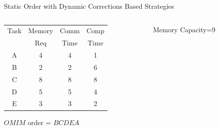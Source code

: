 \documentclass[mathserif,hyperref={pdfpagemode=FullScreen}]{beamer}
\newcommand{\schedule}[3]{
	\draw[->] (-0.2, 0) -- (#1, 0) node[below] {$t$};
	\draw (0, 0) -- (0, 1.5);
	\node at (-0.8, 0.75)[rotate=90] {#2};
	\draw[dashed,gray] (0, 0.75) -- (#1, 0.75);
	\foreach \t in {0,#3} {
		\node[xtick=\t] at (\t, 0){};
	}
}
\newcommand{\task}[6][0]{
	\node[comm=#2 start #3 length #4 color #6]{};
	\node[comp=#2 start #3+#4+#1 length #5 color #6]{}; 
}
\begin{document}
\begin{frame}{Static Order with Dynamic Corrections Based Strategies}
\begin{columns}
	\footnotesize
	\begin{column}[c]{0.4\linewidth}
		\begin{center}
		\begin{tabular}{|c|c|c|c|}
			\hline
	Task & Memory & Comm & Comp\\
& Req & Time & Time\\ \hline 
			A & 4 & 4 &  1\\ \hline
			B & 2 & 2 & 6\\ \hline
			C & 8 & 8 & 8\\ \hline
			D & 5 & 5 & 4\\ \hline
			E & 3 & 3 & 2\\ \hline
		\end{tabular}
\end{center}
	
$OMIM$ order = $BCDEA$
	\end{column}
	\begin{column}[c]{0.6\linewidth}
		\begin{block}{Memory Capacity=9}
\newcommand{\taskA}[2][0]{\task[####1]{$A$}{####2}{4}{1}{cyan}}
\newcommand{\taskB}[2][0]{\task[####1]{$B$}{####2}{2}{6}{cyan!50!black}}
\newcommand{\taskC}[2][0]{\task[####1]{$C$}{####2}{8}{8}{blue!40!white}}
\newcommand{\taskD}[2][0]{\task[####1]{$D$}{####2}{5}{4}{blue!70!white}}
\newcommand{\taskE}[2][0]{\task[####1]{$E$}{####2}{3}{2}{blue}}
		\end{block}
	\end{column}	
\end{columns}
\end{frame}
\end{document}
